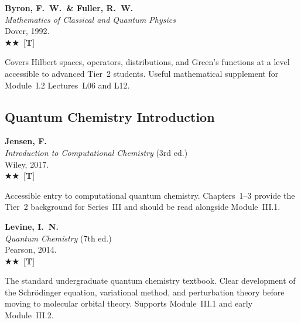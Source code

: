 \documentclass[11pt,a4paper]{article}
\newcommand{\recommended}{$\bigstar\bigstar$}
\newenvironment{bibentry}[1]{\begin{tcolorbox}[entrybox=#1,top=4pt,bottom=4pt]}{\end{tcolorbox}\smallskip}
\begin{document}
\begin{bibentry}{t2light}
\textbf{Byron, F.~W.\ \& Fuller, R.~W.}\\
\textit{Mathematics of Classical and Quantum Physics}\\
Dover, 1992.\\[3pt]
\recommended\ [\textbf{T}]\\[3pt]
\begin{tcolorbox}[annotbox]
Covers Hilbert spaces, operators, distributions, and Green's functions at a level
accessible to advanced Tier~2 students. Useful mathematical supplement for
Module~I.2 Lectures~L06 and L12.
\end{tcolorbox}
\end{bibentry}

\subsection{Quantum Chemistry Introduction}

\begin{bibentry}{t2light}
\textbf{Jensen, F.}\\
\textit{Introduction to Computational Chemistry} (3rd ed.)\\
Wiley, 2017.\\[3pt]
\recommended\ [\textbf{T}]\\[3pt]
\begin{tcolorbox}[annotbox]
Accessible entry to computational quantum chemistry. Chapters~1--3 provide the Tier~2
background for Series~III and should be read alongside Module~III.1.
\end{tcolorbox}
\end{bibentry}

\begin{bibentry}{t2light}
\textbf{Levine, I.~N.}\\
\textit{Quantum Chemistry} (7th ed.)\\
Pearson, 2014.\\[3pt]
\recommended\ [\textbf{T}]\\[3pt]
\begin{tcolorbox}[annotbox]
The standard undergraduate quantum chemistry textbook. Clear development of
the Schr\"odinger equation, variational method, and perturbation theory before
moving to molecular orbital theory. Supports Module~III.1 and early Module~III.2.
\end{tcolorbox}
\end{bibentry}
\end{document}
